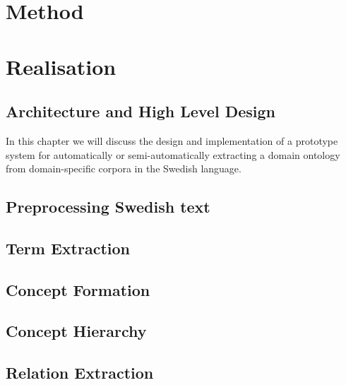 \documentclass[a4paper]{report}
\begin{document}
\chapter{Method}

\chapter{Realisation}

\section{Architecture and High Level Design}

In this chapter we will discuss the design and implementation of a prototype system for automatically or semi-automatically extracting a domain ontology from domain-specific corpora in the Swedish language.

\section{Preprocessing Swedish text}

\section{Term Extraction}

\section{Concept Formation}

\section{Concept Hierarchy}

\section{Relation Extraction}
\end{document}
